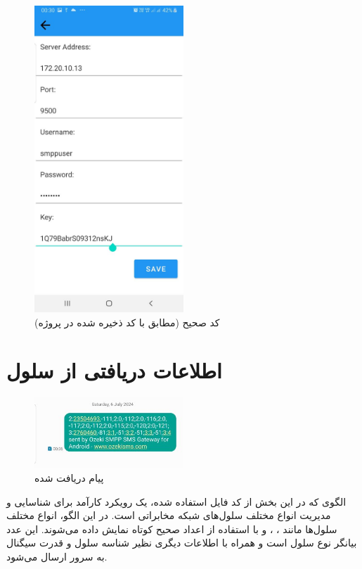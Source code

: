 \documentclass{report}
\begin{document}
\begin{figure}[b]
	\centering
	\includegraphics[width=0.5\textwidth]{Pic/CorrectCode}
	\caption{کد صحیح (مطابق با کد ذخیره شده در پروژه)}
	\label{fig:CorrectCode}
\end{figure}


\section{اطلاعات دریافتی از سلول}
\begin{figure}[b]
	\centering
	\includegraphics[width=0.5\textwidth]{Pic/Message}
	\caption{پیام دریافت شده}
	\label{fig:Message}
\end{figure}
\begin{latin}
	
	\label{code:enums}
\end{latin}
الگوی
 که در این بخش از کد فایل 
استفاده شده، یک رویکرد کارآمد برای شناسایی و مدیریت انواع مختلف سلول‌های شبکه مخابراتی است. در این الگو، انواع مختلف سلول‌ها مانند
 ،
  ،
    و
      با استفاده از اعداد صحیح کوتاه نمایش داده می‌شوند. این عدد بیانگر نوع سلول است و همراه با اطلاعات دیگری نظیر شناسه سلول و قدرت سیگنال به سرور ارسال می‌شود.
\end{document}
